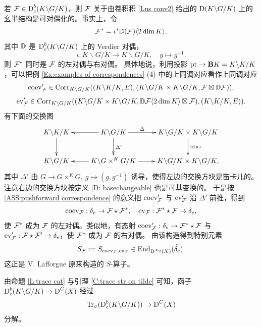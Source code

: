 若 ${\mathcal F}\in \operatorname{D}_c^b(K\backslash G/K)$，则 ${\mathcal F}$ 关于由卷积积 \eqref{Lus conv2} 给出的 $\operatorname{D}(K\backslash G/K)$ 上的幺半结构是可对偶化的。事实上，令
\[{\mathcal F}^*=\iota^*{\mathbb D}({\mathcal F})\langle2\dim K\rangle,\]
其中 ${\mathbb D}$ 是 $\operatorname{D}_c^b(K\backslash G/K)$ 上的 Verdier 对偶，
$$\iota: K\backslash G/K\to K\backslash G/K,\quad  g\mapsto g^{-1}.$$
则 ${\mathcal F}^*$ 同时是 ${\mathcal F}$ 的左对偶与右对偶。
具体地说，利用投影 $\operatorname{pt}\to \mathbf BK=K\backslash K/K$，可以把例 \ref{Ex:examples of correspondences} (4) 中的上同调对应看作上同调对应
\[\operatorname{coev}'_{{\mathcal F}}\in \operatorname{Corr}_{K\backslash G/K}((K\backslash K/K, E), (K\backslash G/K\times K\backslash G/K, {\mathcal F}\boxtimes {\mathbb D} {\mathcal F})),\]
\[\operatorname{ev}'_{{\mathcal F}}\in\operatorname{Corr}_{K\backslash G/K}((K\backslash G/K\times K\backslash G/K, {\mathbb D}{\mathcal F}\langle2\dim K\rangle\boxtimes {\mathcal F}), (K\backslash K/K,E)).\]
有下面的交换图
\[
\xymatrix{
K\backslash K/K\ar[d]&\ar[l] K\backslash G/K\ar^-\Delta[r]\ar^{\Delta'}[d]& K\backslash G/K\times K\backslash G/K\ar^{\id\times\iota}[d]\\
K\backslash G/K&\ar[l] K\backslash G\times^KG/K\ar[r]& K\backslash G/K\times K\backslash G/K,
}\]
其中 $\Delta'$ 由 $G\to G\times^KG,\ g\mapsto (g,g^{-1})$ 诱导，使得左边的交换方块是笛卡儿的。注意右边的交换方块按定义 \ref{D: basechangeable} 也是可基变换的。
于是按 \eqref{ASS:pushforward correspondence} 的意义把 $\operatorname{coev}'_{{\mathcal F}}$ 与 $\operatorname{ev}'_{\mathcal F}$ 沿 $\Delta'$ 前推，得到
\begin{equation*}
\label{E:unandcoun}
\operatorname{coev}_{{\mathcal F}}: \delta_e\to {\mathcal F}\star {\mathcal F}^*,\quad \operatorname{ev}_{{\mathcal F}}:{\mathcal F}^*\star{\mathcal F}\to \delta_e,
\end{equation*}
使 ${\mathcal F}^*$ 成为 ${\mathcal F}$ 的左对偶。类似地，有态射 $\operatorname{coev}'_{{\mathcal F}}:\delta_e\to {\mathcal F}^*\star {\mathcal F}$ 与 $\operatorname{ev}'_{{\mathcal F}}:{\mathcal F}\star{\mathcal F}'\to \delta_e$，使 ${\mathcal F}^*$ 成为 ${\mathcal F}$ 的右对偶。
由该构造得到特别元素
\begin{equation}
\label{E: SLa}
S_{{\mathcal F}}:=S_{\operatorname{coev}_{\mathcal F},\operatorname{ev}_{\mathcal F}}\in {\operatorname{End}}_{\operatorname{D}^{X_2}(X)}(\widetilde{\delta_e}).
\end{equation}
这正是 V. Lafforgue 原来构造的 $S$-算子。

由命题 \ref{L:trace cat} 与引理 \ref{C:trace str on tilde} 可知，函子 $\operatorname{D}_c^b(K\backslash G/K)\to \operatorname{D}^{C}(X)$ 经过
\[
{\operatorname{Tr}}_\sigma(\operatorname{D}_c^b(K\backslash G/K))\to \operatorname{D}^{C}(X)
\]
分解。
